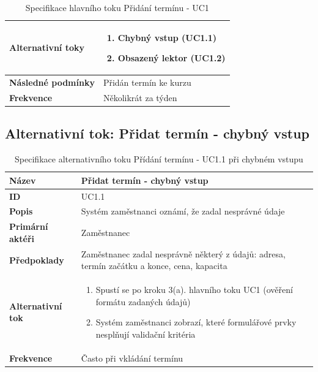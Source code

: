 \documentclass[12pt,a4paper,titlepage,final]{report}
\begin{document}
\begin{table}[h!]
\begin{center}
\begin{tabular}{ | p{4.5cm} | p{13cm} | }
    \textbf{Alternativní toky} & 
    \vspace{-3.5mm}
    \begin{enumerate}
		\itemsep0em 
		\item Chybný vstup (UC1.1)
		\item Obsazený lektor (UC1.2)
	\end{enumerate}
    \\ \hline 
        
    \textbf{Následné podmínky} & Přidán termín ke kurzu
    \\ \hline    
    
	\textbf{Frekvence} & Několikrát za týden
	\\ \hline		
    \end{tabular}
	\end{center}	
	\caption{Specifikace hlavního toku Přidání termínu - UC1}  
\end{table}

\newpage

\subsection{Alternativní tok: Přidat termín - chybný vstup}

\begin{table}[!h]
	\begin{center}
    \begin{tabular}{ | p{4.5cm} | p{13cm} | }
    \hline
    \textbf{Název} & Přidat termín - chybný vstup
    \\ \hline
    
	\textbf{ID} & UC1.1
	\\ \hline
	
	\textbf{Popis} & Systém zaměstnanci oznámí, že zadal nesprávné údaje
	\\ \hline
	    
	\textbf{Primární aktéři} & Zaměstnanec
	\\ \hline
	
	\textbf{Předpoklady} & Zaměstnanec zadal nesprávně některý z údajů: adresa, termín začátku a konce, cena, kapacita
    \\ \hline
    
    \textbf{Alternativní tok} & 
    \vspace{-3.5mm}
    \begin{enumerate}
        \itemsep0em 
    	\item Spustí se po kroku 3(a). hlavního toku UC1 (ověření formátu zadaných údajů)
    	\item Systém zaměstnanci zobrazí, které formulářové prvky nesplňují validační kritéria
    \end{enumerate}
    \\ \hline  
    
	\textbf{Frekvence} & Často při vkládání termínu
	\\ \hline
	\end{tabular}
		\caption{Specifikace alternativního toku Přídání termínu - UC1.1 při chybném vstupu}	
	\end{center}
\end{table}
\end{document}
